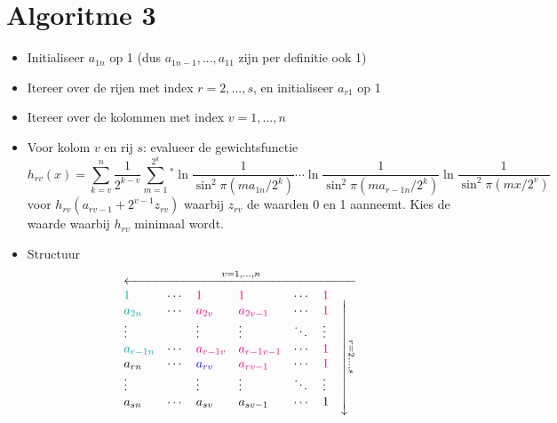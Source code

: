 \documentclass[a4paper, 12pt]{article}
\begin{document}
\section{Algoritme 3}
\begin{itemize}
\item Initialiseer $a_{1n}$ op 1 (dus $a_{1n-1},...,a_{11}$ zijn per definitie ook 1)
\item Itereer over de rijen met index $r=2,...,s$, en initialiseer $a_{r1}$ op 1
\item Itereer over de kolommen met index $v=1,...,n$
\item Voor kolom $v$ en rij $s$: evalueer de gewichtsfunctie
\begin{equation}
h_{rv}(x)= \sum_{k=v}^n\frac{1}{2^{k-v}} \sum_{m=1}^{2^k}{}^*\ln{\frac{1}{\sin^2{\pi(ma_{1n}/2^k)}}}\cdots\ln{\frac{1}{\sin^2{\pi(ma_{r-1n}/2^k)}}}\ln{\frac{1}{\sin^2{\pi(mx/2^v)}}}
\end{equation}
voor $h_{rv}(a_{rv-1}+2^{v-1}z_{rv})$ waarbij $z_{rv}$ de waarden 0 en 1 aanneemt. Kies de waarde waarbij $h_{rv}$ minimaal wordt.
\item Structuur
\begin{equation}
\begin{array}{lllllll}
\multicolumn{7}{c}{\xleftarrow{\mbox{\hspace{75pt}}v=1,...,n\mbox{\hspace{75pt}}}} \\
\mbox{\textcolor{Emerald}{$1$}} & \cdots & \mbox{\textcolor{RubineRed}{$1$}} & \mbox{\textcolor{RubineRed}{$1$}} & \cdots & \mbox{\textcolor{RubineRed}{$1$}} & \multirow{7}{*}{\rotatebox{270}{$\xrightarrow{\mbox{\hspace{30pt}}r=2,..,s\mbox{\hspace{30pt}}}$}}\\
\mbox{\textcolor{Emerald}{$a_{2n}$}} & \cdots & \mbox{\textcolor{RubineRed}{$a_{2v}$}} & \mbox{\textcolor{RubineRed}{$a_{2v-1}$}} & \cdots & 
\mbox{\textcolor{RubineRed}{$1$}} & \\
\vdots & & \vdots & \vdots & \ddots & \vdots & \\
\mbox{\textcolor{Emerald}{$a_{r-1n}$}} & \cdots & \mbox{\textcolor{RubineRed}{$a_{r-1v}$}} & \mbox{\textcolor{RubineRed}{$a_{r-1v-1}$}} & \cdots & 
\mbox{\textcolor{RubineRed}{$1$}} & \\
a_{rn} & \cdots & \mbox{\textcolor{Blue}{$a_{rv}$}} & \mbox{\textcolor{RubineRed}{$a_{rv-1}$}} & \cdots & 
\mbox{\textcolor{RubineRed}{$1$}} & \\
\vdots & & \vdots & \vdots & \ddots & \vdots & \\
a_{sn} & \cdots & a_{sv}& a_{sv-1} & \cdots & 1 & \\
\end{array}
\end{equation}
\end{itemize}
\end{document}
